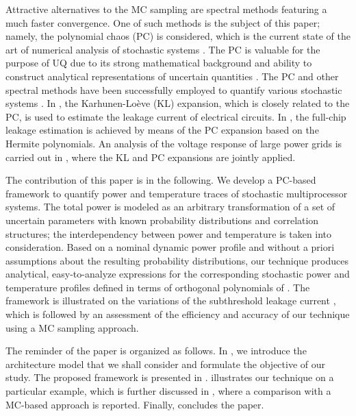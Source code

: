 Attractive alternatives to the MC sampling are spectral methods \cite{xiu2010, maitre2010, ghanem1991} featuring a much faster convergence. One of such methods is the subject of this paper; namely, the polynomial chaos (PC) is considered, which is the current state of the art of numerical analysis of stochastic systems \cite{xiu2010}. The PC is valuable for the purpose of UQ due to its strong mathematical background and ability to construct analytical representations of uncertain quantities \cite{eldred2009}. The PC and other spectral methods have been successfully employed to quantify various stochastic systems \cite{xiu2010}. In \cite{bhardwaj2006}, the Karhunen-Lo\`{e}ve (KL) expansion, which is closely related to the PC, is used to estimate the leakage current of electrical circuits. In \cite{shen2009}, the full-chip leakage estimation is achieved by means of the PC expansion based on the Hermite polynomials. An analysis of the voltage response of large power grids is carried out in \cite{ghanta2006}, where the KL and PC expansions are jointly applied.

The contribution of this paper is in the following. We develop a PC-based framework to quantify power and temperature traces of stochastic multiprocessor systems. The total power is modeled as an arbitrary transformation of a set of uncertain parameters with known probability distributions and correlation structures; the interdependency between power and temperature is taken into consideration. Based on a nominal dynamic power profile and without a priori assumptions about the resulting probability distributions, our technique produces analytical, easy-to-analyze expressions for the corresponding stochastic power and temperature profiles defined in terms of orthogonal polynomials of \rvs. The framework is illustrated on the variations of the subthreshold leakage current \cite{srivastava2010}, which is followed by an assessment of the efficiency and accuracy of our technique using a MC sampling approach.

The reminder of the paper is organized as follows. In , we introduce the architecture model that we shall consider and formulate the objective of our study. The proposed framework is presented in .  illustrates our technique on a particular example, which is further discussed in , where a comparison with a MC-based approach is reported. Finally,  concludes the paper.
